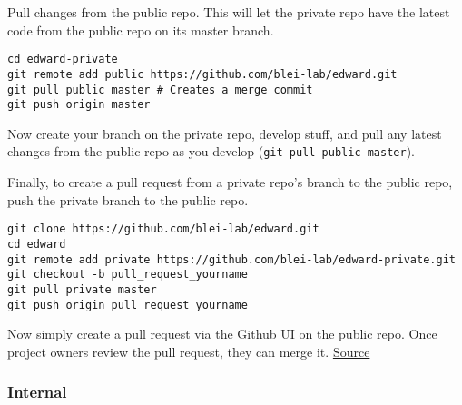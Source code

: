 Pull changes from the public repo. This will let the private repo have
the latest code from the public repo on its master branch.

\begin{lstlisting}[class=JSON]
cd edward-private
git remote add public https://github.com/blei-lab/edward.git
git pull public master # Creates a merge commit
git push origin master
\end{lstlisting}

Now create your branch on the private repo, develop stuff, and pull any
latest changes from the public repo as you develop
(\texttt{git\ pull\ public\ master}).

Finally, to create a pull request from a private repo's branch to the
public repo, push the private branch to the public repo.

\begin{lstlisting}[class=JSON]
git clone https://github.com/blei-lab/edward.git
cd edward
git remote add private https://github.com/blei-lab/edward-private.git
git checkout -b pull_request_yourname
git pull private master
git push origin pull_request_yourname
\end{lstlisting}

Now simply create a pull request via the Github UI on the public repo.
Once project owners review the pull request, they can merge it.
\href{http://stackoverflow.com/questions/10065526/github-how-to-make-a-fork-of-public-repository-private/30352360\#30352360}{Source}

\subsubsection{Internal}


